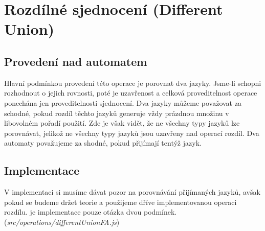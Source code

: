 \section{Rozdílné sjednocení (Different Union)}
\subsection{Provedení nad automatem}
Hlavní podmínkou provedení této operace je porovnat dva jazyky. Jsme-li schopni rozhodnout o jejich rovnosti, poté je uzavřenost a celková proveditelnost operace ponechána jen proveditelnosti sjednocení. Dva jazyky můžeme považovat za schodné, pokud rozdíl těchto jazyků generuje vždy prázdnou množinu v libovolném pořadí použití. Zde je však vidět, že ne všechny typy jazyků lze porovnávat, jelikož ne všechny typy jazyků jsou uzavřeny nad operací rozdíl. Dva automaty považujeme za shodné, pokud přijímají tentýž jazyk.

\subsection{Implementace}
V implementaci si musíme dávat pozor na porovnávání přijímaných jazyků, avšak pokud se budeme držet teorie a použijeme dříve implementovanou operaci rozdílu. je implementace pouze otázka dvou podmínek.
(\textit{src/operations/differentUnionFA.js})